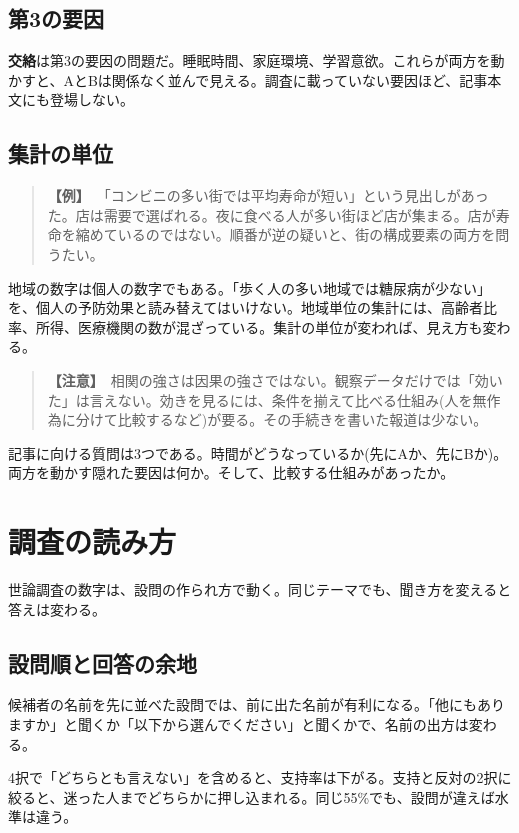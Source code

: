 \documentclass{article}
\begin{document}
\subsection{第3の要因}

\textbf{交絡}は第3の要因の問題だ。睡眠時間、家庭環境、学習意欲。これらが両方を動かすと、AとBは関係なく並んで見える。調査に載っていない要因ほど、記事本文にも登場しない。

\subsection{集計の単位}

\begin{quote}
\textbf{【例】}\ 「コンビニの多い街では平均寿命が短い」という見出しがあった。店は需要で選ばれる。夜に食べる人が多い街ほど店が集まる。店が寿命を縮めているのではない。順番が逆の疑いと、街の構成要素の両方を問うたい。
\end{quote}

地域の数字は個人の数字でもある。「歩く人の多い地域では糖尿病が少ない」を、個人の予防効果と読み替えてはいけない。地域単位の集計には、高齢者比率、所得、医療機関の数が混ざっている。集計の単位が変われば、見え方も変わる。

\begin{quote}
\textbf{【注意】}\ 相関の強さは因果の強さではない。観察データだけでは「効いた」は言えない。効きを見るには、条件を揃えて比べる仕組み(人を無作為に分けて比較するなど)が要る。その手続きを書いた報道は少ない。
\end{quote}

記事に向ける質問は3つである。時間がどうなっているか(先にAか、先にBか)。両方を動かす隠れた要因は何か。そして、比較する仕組みがあったか。

\section{調査の読み方}

世論調査の数字は、設問の作られ方で動く。同じテーマでも、聞き方を変えると答えは変わる。

\subsection{設問順と回答の余地}

候補者の名前を先に並べた設問では、前に出た名前が有利になる。「他にもありますか」と聞くか「以下から選んでください」と聞くかで、名前の出方は変わる。

4択で「どちらとも言えない」を含めると、支持率は下がる。支持と反対の2択に絞ると、迷った人までどちらかに押し込まれる。同じ55\%でも、設問が違えば水準は違う。
\end{document}
